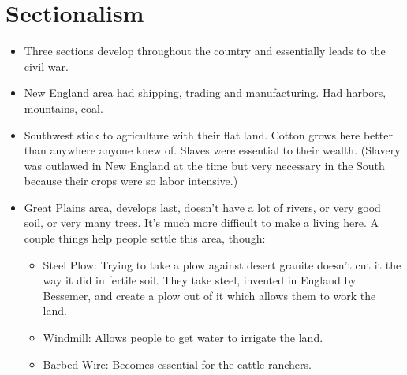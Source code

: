 \documentclass{article}
\begin{document}
\section{Sectionalism}
  \begin{itemize}
    \item Three sections develop throughout the country and essentially leads to the civil war.
    \item New England area had shipping, trading and manufacturing. Had harbors, mountains, coal.
    \item Southwest stick to agriculture with their flat land. Cotton grows here better than anywhere anyone knew of. Slaves were essential to their wealth. (Slavery was outlawed in New England at the time but very necessary in the South because their crops were so labor intensive.)
    \item Great Plains area, develops last, doesn't have a lot of rivers, or very good soil, or very many trees. It's much more difficult to make a living here. A couple things help people settle this area, though:
      \begin{itemize}
        \item Steel Plow: Trying to take a plow against desert granite doesn't cut it the way it did in fertile soil. They take steel, invented in England by Bessemer, and create a plow out of it which allows them to work the land.
        \item Windmill: Allows people to get water to irrigate the land.
        \item Barbed Wire: Becomes essential for the cattle ranchers.
      \end{itemize}
  \end{itemize}
\end{document}
